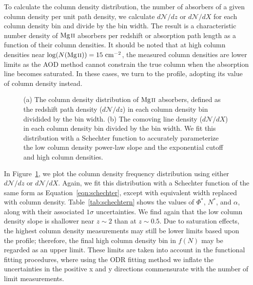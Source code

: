 
To calculate the column density distribution, the number of absorbers of a given column density per unit path density, we calculate $d\mathcal{N}\!/dz$ or $d\mathcal{N}\!/dX$ for each column density bin and divide by the bin width. The result is a characteristic number density of ${\hbox{{\rm Mg}\kern 0.1em{\sc ii}}}$ absorbers per redshift or absorption path length as a function of their column densities. It should be noted that at high column densities near $\log (N({\hbox{{\rm Mg}\kern 0.1em{\sc ii}}})) = 15~\mathrm{cm^{-2}}$, the measured column densities are lower limits as the AOD method cannot constrain the true column when the absorption line becomes saturated. In these cases, we turn to the {\MgIIsecond} profile, adopting its value of column density instead.

\begin{figure*}[bth]
\caption{(a) The column density distribution of ${\hbox{{\rm Mg}\kern 0.1em{\sc ii}}}$ absorbers, defined as the redshift path density ($d\mathcal{N}\!/dz$) in each column density bin dividided by the bin width. (b) The comoving line density ($d\mathcal{N}\!/dX$) in each column density bin divided by the bin width. We fit this distribution with a Schechter function to accurately parameterize the low column density power-law slope and the exponential cutoff and high column densities.}
\label{fig:logndistro}
\end{figure*}

In Figure~\ref{fig:logndistro}, we plot the column density frequency distribution using either $d\mathcal{N}\!/dz$ or $d\mathcal{N}\!/dX$. Again, we fit this distribution with a Schechter function of the same form as Equation~\ref{eqn:schechter}, except with equivalent width replaced with column density. Table~\ref{tab:schechtern} shows the values of $\Phi^*$, $N^*$, and $\alpha$, along with their associated $1\sigma$ uncertainties. We find again that the low column density slope is shallower near $z \sim 2$ than at $z \sim 0.5$. Due to saturation effects, the highest column density measurements may still be lower limits based upon the {\MgIIsecond} profile; therefore, the final high column density bin in $f(N)$ may be regarded as an upper limit. These limits are taken into account in the functional fitting procedures, where using the ODR fitting method we inflate the uncertainties in the positive x and y directions commensurate with the number of limit measurements.


